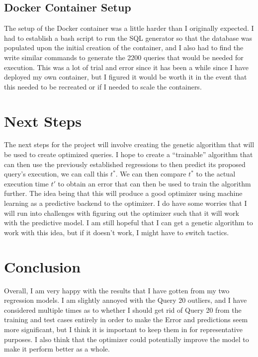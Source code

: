 \documentclass[sigconf]{acmart}
\begin{document}
\subsection{Docker Container Setup}
The setup of the Docker container was a little harder than I originally expected. I had to establish a bash script to run the SQL generator so that the database was populated upon the initial creation
of the container, and I also had to find the write similar commands to generate the 2200 queries that would be needed for execution. This was a lot of trial and error since it has been a while since I have
deployed my own container, but I figured it would be worth it in the event that this needed to be recreated or if I needed to scale the containers.

\section{Next Steps}
The next steps for the project will involve creating the genetic algorithm that will be used to create optimized queries. I hope to create a ``trainable'' algorithm that can then use the previously established
regressions to then predict its proposed query's execution, we can call this $t^*$. We can then compare $t^*$ to the actual execution time $t'$ to obtain an error that can then be used to train the algorithm further.
The idea being that this will produce a good optimizer using machine learning as a predictive backend to the optimizer. I do have some worries that I will run into challenges with figuring out the optimizer such that it
will work with the predictive model. I am still hopeful that I can get a genetic algorithm to work with this idea, but if it doesn't work, I might have to switch tactics.

\section{Conclusion}
Overall, I am very happy with the results that I have gotten from my two regression models. I am slightly annoyed with the Query 20 outliers, and I have considered multiple times as to whether I should get rid of Query 20
from the training and test cases entirely in order to make the Error and predictions seem more significant, but I think it is important to keep them in for representative purposes. I also think that the optimizer could potentially
improve the model to make it perform better as a whole.



\end{document}

